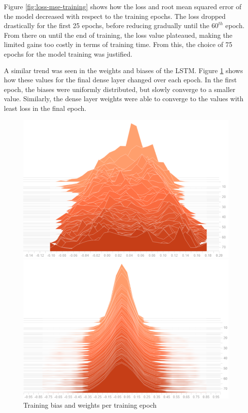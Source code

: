 Figure \ref{fig:loss-mse-training} shows how the loss and root mean squared error of the model decreased with respect to the training epochs. The loss dropped drastically for the first 25 epochs, before reducing gradually until the $60^{th}$ epoch. From there on until the end of training, the loss value plateaued, making the limited gains too costly in terms of training time. From this, the choice of 75 epochs for the model training was justified.\par

A similar trend was seen in the weights and biases of the LSTM. Figure \ref{fig:bias-weight-training} shows how these values for the final dense layer changed over each epoch. In the first epoch, the biases were uniformly distributed, but slowly converge to a smaller value. Similarly, the dense layer weights were able to converge to the values with least loss in the final epoch.\par

\begin{figure}[htb]
    \centering
    \caption{Training bias and weights per training epoch}
    \label{fig:bias-weight-training}
    \begin{minipage}{0.6\linewidth}
        \includegraphics[width=1.0\linewidth]{Figures/LSTM-Bias.pdf}
    \end{minipage}\hfill
    \begin{minipage}{0.6\linewidth}
        \includegraphics[width=1.0\linewidth]{Figures/LSTM-Weights.pdf}
    \end{minipage}
\end{figure}

